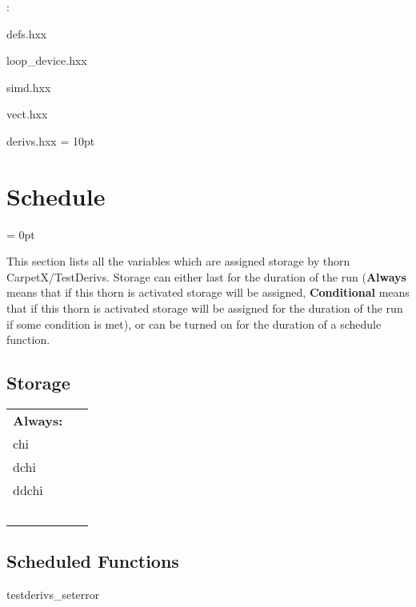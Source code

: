 \vspace{5mm}

: 

defs.hxx

loop\_device.hxx

simd.hxx

vect.hxx

derivs.hxx
\vspace{2mm}\parskip = 10pt 

\section{Schedule} 


\parskip = 0pt


\noindent This section lists all the variables which are assigned storage by thorn CarpetX/TestDerivs.  Storage can either last for the duration of the run ({\bf Always} means that if this thorn is activated storage will be assigned, {\bf Conditional} means that if this thorn is activated storage will be assigned for the duration of the run if some condition is met), or can be turned on for the duration of a schedule function.


\subsection*{Storage}

\hspace{5mm}

 \begin{tabular*}{160mm}{ll} 

{\bf Always:}&  ~ \\ 
 chi & ~\\ 
 dchi & ~\\ 
 ddchi & ~\\ 
~ & ~\\ 
\end{tabular*} 


\subsection*{Scheduled Functions}
\vspace{5mm}


\hspace{5mm} testderivs\_seterror 

\hspace{5mm}{\it set up test grid } 


